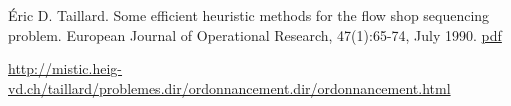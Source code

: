 \documentclass[11pt, a4wide]{article}
\begin{document}
\begin{thebibliography}{}
Éric D. Taillard. 
Some efficient heuristic methods for the flow shop sequencing problem. 
European Journal of Operational Research, 47(1):65-74, July 1990.
\href{http://mistic.heig-vd.ch/taillard/articles.dir/Taillard1990.pdf}{pdf}

\url{http://mistic.heig-vd.ch/taillard/problemes.dir/ordonnancement.dir/ordonnancement.html}

\end{thebibliography}
\end{document}
